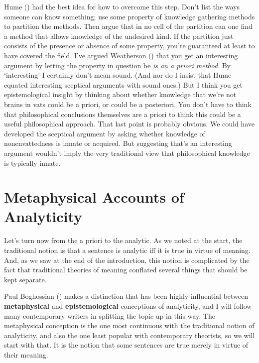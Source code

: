 \documentclass[
  11pt,
  letterpaper,
  DIV=11,
  numbers=noendperiod,
  twoside]{scrartcl}
\newcounter{none} %
\begin{document}
Hume () had the best idea for how
to overcome this step. Don't list the ways someone can know something;
use some property of knowledge gathering methods to partition the
methods. Then argue that in no cell of the partition can one find a
method that allows knowledge of the undesired kind. If the partition
just consists of the presence or absence of some property, you're
guaranteed at least to have covered the field. I've argued Weatherson
() that you get an interesting
argument by letting the property in question be \emph{is an a priori
method}. By `interesting' I certainly don't mean sound. (And nor do I
insist that Hume equated interesting sceptical arguments with sound
ones.) But I think you get epistemological insight by thinking about
whether knowledge that we're not brains in vats could be a priori, or
could be a posteriori. You don't have to think that philosophical
conclusions themselves are a priori to think this could be a useful
philosophical approach. That last point is probably obvious. We could
have developed the sceptical argument by asking whether knowledge of
nonenvattedness is innate or acquired. But suggesting that's an
interesting argument wouldn't imply the very traditional view that
philosophical knowledge is typically innate.

\section{Metaphysical Accounts of
Analyticity}\label{metaphysicalaccountsofanalyticity}

Let's turn now from the a priori to the analytic. As we noted at the
start, the traditional notion is that a sentence is analytic iff it is
true in virtue of meaning. And, as we saw at the end of the
introduction, this notion is complicated by the fact that traditional
theories of meaning conflated several things that should be kept
separate.

Paul Boghossian () makes a
distinction that has been highly influential between
\textbf{metaphysical} and \textbf{epistemological} conceptions of
analyticity, and I will follow many contemporary writers in splitting
the topic up in this way. The metaphysical conception is the one most
continuous with the traditional notion of analyticity, and also the one
least popular with contemporary theorists, so we will start with that.
It is the notion that some sentences are true merely in virtue of their
meaning.
\end{document}
